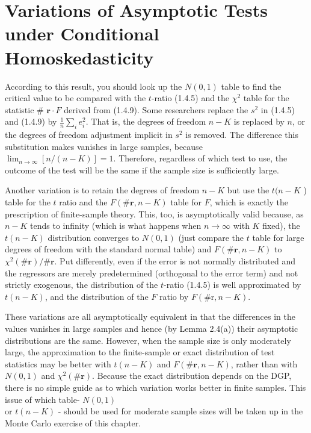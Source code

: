 \documentclass[10pt]{article}
\begin{document}
\section*{Variations of Asymptotic Tests under Conditional Homoskedasticity}
According to this result, you should look up the $N(0,1)$ table to find the critical value to be compared with the $t$-ratio (1.4.5) and the $\chi^{2}$ table for the statistic \# $\mathbf{r} \cdot F$ derived from (1.4.9). Some researchers replace the $s^{2}$ in (1.4.5) and (1.4.9) by $\frac{1}{n} \sum_{i} e_{i}^{2}$. That is, the degrees of freedom $n-K$ is replaced by $n$, or the degrees of freedom adjustment implicit in $s^{2}$ is removed. The difference this substitution makes vanishes in large samples, because $\lim _{n \rightarrow \infty}[n /(n-K)]=1$. Therefore, regardless of which test to use, the outcome of the test will be the same if the sample size is sufficiently large.

Another variation is to retain the degrees of freedom $n-K$ but use the $t(n- K$ ) table for the $t$ ratio and the $F(\# \mathbf{r}, n-K)$ table for $F$, which is exactly the prescription of finite-sample theory. This, too, is asymptotically valid because, as $n-K$ tends to infinity (which is what happens when $n \rightarrow \infty$ with $K$ fixed), the $t(n-K)$ distribution converges to $N(0,1)$ (just compare the $t$ table for large degrees of freedom with the standard normal table) and $F(\# \mathbf{r}, n-K)$ to $\chi^{2}(\# \mathbf{r}) / \# \mathbf{r}$. Put differently, even if the error is not normally distributed and the regressors are merely predetermined (orthogonal to the error term) and not strictly exogenous, the distribution of the $t$-ratio (1.4.5) is well approximated by $t(n-K)$, and the distribution of the $F$ ratio by $F(\# \mathrm{r}, n-K)$.

These variations are all asymptotically equivalent in that the differences in the values vanishes in large samples and hence (by Lemma 2.4(a)) their asymptotic distributions are the same. However, when the sample size is only moderately large, the approximation to the finite-sample or exact distribution of test statistics may be better with $t(n-K)$ and $F(\# \mathbf{r}, n-K)$, rather than with $N(0,1)$ and $\chi^{2}(\# \mathbf{r})$. Because the exact distribution depends on the DGP, there is no simple guide as to which variation works better in finite samples. This issue of which table- $N(0,1)$\\
or $t(n-K)$ - should be used for moderate sample sizes will be taken up in the Monte Carlo exercise of this chapter.
\end{document}
